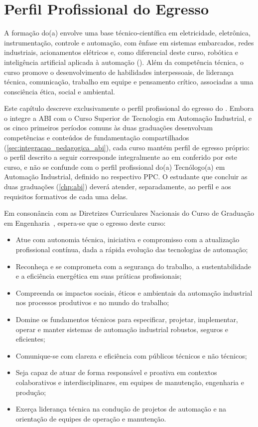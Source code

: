 \chapter{Perfil Profissional do Egresso}
\label{chp:perfil_egresso}

A formação do(a) \ppctitulacao envolve uma base técnico-científica em eletricidade, eletrônica, instrumentação, controle e automação, com ênfase em sistemas embarcados, redes industriais, acionamentos elétricos e, como diferencial deste curso, robótica e inteligência artificial aplicada à automação (\ppcenfasecurricular). Além da competência técnica, o curso promove o desenvolvimento de habilidades interpessoais, de liderança técnica, comunicação, trabalho em equipe e pensamento crítico, associadas a uma consciência ética, social e ambiental.

Este capítulo descreve exclusivamente o perfil profissional do egresso do \ppccurso. Embora o \ppccurso integre a ABI com o Curso Superior de Tecnologia em Automação Industrial, e os cinco primeiros períodos comuns às duas graduações desenvolvam competências e conteúdos de fundamentação compartilhados (\autoref{sec:integracao_pedagogica_abi}), cada curso mantém perfil de egresso próprio: o perfil descrito a seguir corresponde integralmente ao \ppcgrau em \ppcenfasecurricular conferido por este curso, e não se confunde com o perfil profissional do(a) Tecnólogo(a) em Automação Industrial, definido no respectivo PPC. O estudante que concluir as duas graduações (\autoref{chp:abi}) deverá atender, separadamente, ao perfil e aos requisitos formativos de cada uma delas.

Em consonância com as Diretrizes Curriculares Nacionais do Curso de Graduação em Engenharia~\cite{cne_ces_2_2019,cne_ces_1_2021}, espera-se que o egresso deste curso:

\begin{itemize}
    \item Atue com autonomia técnica, iniciativa e compromisso com a atualização profissional contínua, dada a rápida evolução das tecnologias de automação;
    \item Reconheça e se comprometa com a segurança do trabalho, a sustentabilidade e a eficiência energética em suas práticas profissionais;
    \item Compreenda os impactos sociais, éticos e ambientais da automação industrial nos processos produtivos e no mundo do trabalho;
    \item Domine os fundamentos técnicos para especificar, projetar, implementar, operar e manter sistemas de automação industrial robustos, seguros e eficientes;
    \item Comunique-se com clareza e eficiência com públicos técnicos e não técnicos;
    \item Seja capaz de atuar de forma responsável e proativa em contextos colaborativos e interdisciplinares, em equipes de manutenção, engenharia e produção;
    \item Exerça liderança técnica na condução de projetos de automação e na orientação de equipes de operação e manutenção.
\end{itemize}

